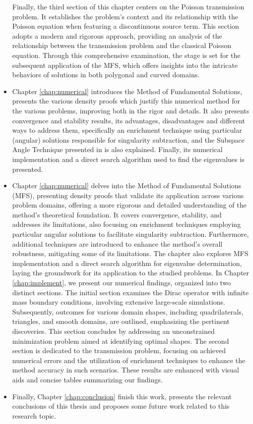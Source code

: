 \begin{itemize}
Finally, the third section of this chapter centers on the Poisson transmission problem. It establishes the problem's context and its relationship with the Poisson equation when featuring a discontinuous source term. This section adopts a modern and rigorous approach, providing an analysis of the relationship between the transmission problem and the classical Poisson equation. Through this comprehensive examination, the stage is set for the subsequent application of the MFS, which offers insights into the intricate behaviors of solutions in both polygonal and curved domains.
\item Chapter \ref{chap:numerical} introduces the Method of Fundamental Solutions, presents the various density proofs which justify this numerical method for the various problems, improving both in the rigor and details. It also presents convergence and stability results, its advantages, disadvantages and different ways to address them, specifically an enrichment technique using particular (angular) solutions responsible for singularity subtraction, and the Subspace Angle Technique presented in \cite{betcke2005reviving} is also explained. Finally, its numerical implementation and a direct search algorithm used to find the eigenvalues is presented.
\item Chapter \ref{chap:numerical} delves into the Method of Fundamental Solutions (MFS), presenting density proofs that validate its application across various problem domains, offering a more rigorous and detailed understanding of the method's theoretical foundation. It covers convergence, stability, and addresses its limitations, also focusing on enrichment techniques employing particular angular solutions to facilitate singularity subtraction. Furthermore, additional techniques are introduced to enhance the method's overall robustness, mitigating some of its limitations. The chapter also explores MFS implementation and a direct search algorithm for 
eigenvalue determination, laying the groundwork for its application to the studied problems.
In Chapter \ref{chap:implement}, we present our numerical findings, organized into two distinct sections. The initial section examines the Dirac operator with infinite mass boundary conditions, involving extensive large-scale simulations. Subsequently, outcomes for various domain shapes, including quadrilaterals, triangles, and smooth domains, are outlined, emphasizing the pertinent discoveries. This section concludes by addressing an unconstrained minimization problem aimed at identifying optimal shapes. The second section is dedicated to the transmission problem, focusing on achieved numerical errors and the utilization of enrichment techniques to enhance the method accuracy in such scenarios. These results are enhanced with visual aids and concise tables summarizing our findings.
\item Finally, Chapter \ref{chap:conclusion} finish this work, presents the relevant conclusions of this thesis and proposes some future work related to this research topic.
\end{itemize}


